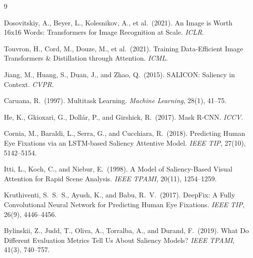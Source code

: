\documentclass{article}
\begin{document}
\begin{thebibliography}{9}

Dosovitskiy, A., Beyer, L., Kolesnikov, A., et al.\ (2021).
An Image is Worth 16x16 Words: Transformers for Image Recognition at Scale.
\textit{ICLR}.

Touvron, H., Cord, M., Douze, M., et al.\ (2021).
Training Data-Efficient Image Transformers \& Distillation through Attention.
\textit{ICML}.

Jiang, M., Huang, S., Duan, J., and Zhao, Q.\ (2015).
SALICON: Saliency in Context.
\textit{CVPR}.

Caruana, R.\ (1997).
Multitask Learning.
\textit{Machine Learning}, 28(1), 41--75.

He, K., Gkioxari, G., Dollár, P., and Girshick, R.\ (2017).
Mask R-CNN.
\textit{ICCV}.

Cornia, M., Baraldi, L., Serra, G., and Cucchiara, R.\ (2018).
Predicting Human Eye Fixations via an LSTM-based Saliency Attentive Model.
\textit{IEEE TIP}, 27(10), 5142--5154.

Itti, L., Koch, C., and Niebur, E.\ (1998).
A Model of Saliency-Based Visual Attention for Rapid Scene Analysis.
\textit{IEEE TPAMI}, 20(11), 1254--1259.

Kruthiventi, S.~S.~S., Ayush, K., and Babu, R.~V.\ (2017).
DeepFix: A Fully Convolutional Neural Network for Predicting Human Eye Fixations.
\textit{IEEE TIP}, 26(9), 4446--4456.

Bylinskii, Z., Judd, T., Oliva, A., Torralba, A., and Durand, F.\ (2019).
What Do Different Evaluation Metrics Tell Us About Saliency Models?
\textit{IEEE TPAMI}, 41(3), 740--757.

\end{thebibliography}
\end{document}
